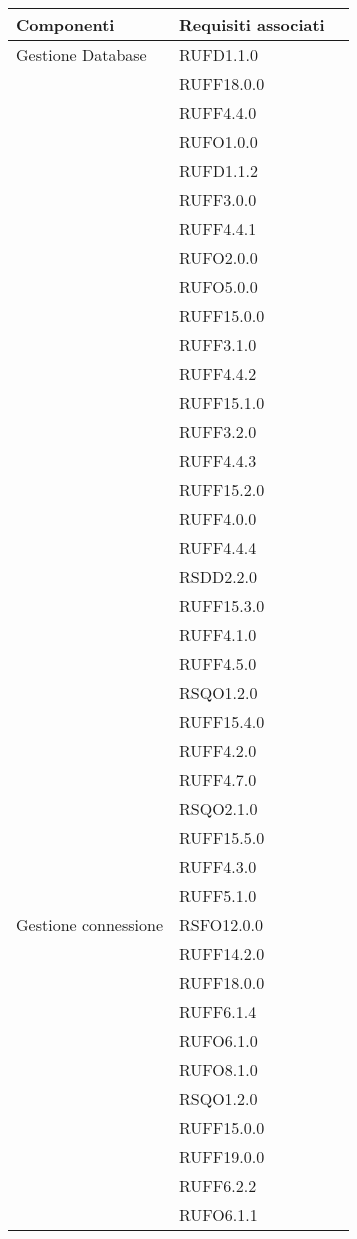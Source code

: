 \begin{center}
\begin{longtable}{lp{}l}
\toprule Componenti & Requisiti associati\\
\midrule
Gestione Database & RUFD1.1.0 \\
 & RUFF18.0.0 \\
 & RUFF4.4.0 \\
 & RUFO1.0.0 \\
 & RUFD1.1.2 \\
 & RUFF3.0.0 \\
 & RUFF4.4.1 \\
 & RUFO2.0.0 \\
 & RUFO5.0.0 \\
 & RUFF15.0.0 \\
 & RUFF3.1.0 \\
 & RUFF4.4.2 \\
 & RUFF15.1.0 \\
 & RUFF3.2.0 \\
 & RUFF4.4.3 \\
 & RUFF15.2.0 \\
 & RUFF4.0.0 \\
 & RUFF4.4.4 \\
 & RSDD2.2.0 \\
 & RUFF15.3.0 \\
 & RUFF4.1.0 \\
 & RUFF4.5.0 \\
 & RSQO1.2.0 \\
 & RUFF15.4.0 \\
 & RUFF4.2.0 \\
 & RUFF4.7.0 \\
 & RSQO2.1.0 \\
 & RUFF15.5.0 \\
 & RUFF4.3.0 \\
 & RUFF5.1.0 \\
Gestione connessione & RSFO12.0.0 \\
 & RUFF14.2.0 \\
 & RUFF18.0.0 \\
 & RUFF6.1.4 \\
 & RUFO6.1.0 \\
 & RUFO8.1.0 \\
 & RSQO1.2.0 \\
 & RUFF15.0.0 \\
 & RUFF19.0.0 \\
 & RUFF6.2.2 \\
 & RUFO6.1.1 \\

\end{longtable}
\end{center}
